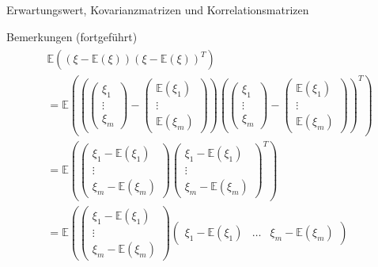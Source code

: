 \documentclass[
  8pt,
  ignorenonframetext,
]{beamer}
\begin{document}
\begin{frame}{Erwartungswert, Kovarianzmatrizen und
Korrelationsmatrizen}
\protect\hypertarget{erwartungswert-kovarianzmatrizen-und-korrelationsmatrizen-3}{}
\vspace{2mm}
\footnotesize
{}

Bemerkungen (fortgeführt) \begin{align}
\begin{split}
& \mathbb{E}\left((\xi - \mathbb{E}(\xi))(\xi - \mathbb{E}(\xi))^T \right) \\
& =
\mathbb{E}
\left(
\left(
\begin{pmatrix}
\xi_1 \\
\vdots \\
\xi_m
\end{pmatrix}
-
\begin{pmatrix}
\mathbb{E}(\xi_1) \\
\vdots \\
\mathbb{E}(\xi_m)
\end{pmatrix}
\right)
\left(
\begin{pmatrix}
\xi_1 \\
\vdots \\
\xi_m
\end{pmatrix}
-
\begin{pmatrix}
\mathbb{E}(\xi_1) \\
\vdots \\
\mathbb{E}(\xi_m)
\end{pmatrix}
\right)^T
\right)
\\
& =
\mathbb{E}
\left(
\begin{pmatrix}
\xi_1 - \mathbb{E}(\xi_1) \\
\vdots \\
\xi_m - \mathbb{E}(\xi_m)
\end{pmatrix}
\begin{pmatrix}
\xi_1 - \mathbb{E}(\xi_1)\\
\vdots \\
\xi_m - \mathbb{E}(\xi_m)
\end{pmatrix}^T
\right)
\\
& =
\mathbb{E}
\left(
\begin{pmatrix}
\xi_1 - \mathbb{E}(\xi_1) \\
\vdots \\
\xi_m - \mathbb{E}(\xi_m)
\end{pmatrix}
\begin{pmatrix}
\xi_1 - \mathbb{E}(\xi_1)
& \dots
& \xi_m - \mathbb{E}(\xi_m)
\end{pmatrix}

\end{split}
\end{align}
\end{frame}
\end{document}
